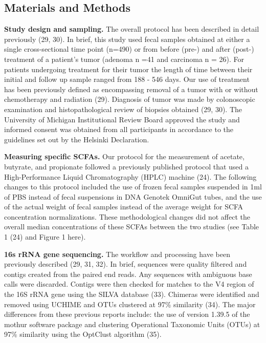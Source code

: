 \documentclass[11pt,]{article}
\begin{document}
\newpage

\subsection{Materials and Methods}\label{materials-and-methods}

\textbf{Study design and sampling.} The overall protocol has been
described in detail previously (29, 30). In brief, this study used fecal
samples obtained at either a single cross-sectional time point (n=490)
or from before (pre-) and after (post-) treatment of a patient's tumor
(adenoma n =41 and carcinoma n = 26). For patients undergoing treatment
for their tumor the length of time between their initial and follow up
sample ranged from 188 - 546 days. Our use of treatment has been
previously defined as encompassing removal of a tumor with or without
chemotherapy and radiation (29). Diagnosis of tumor was made by
colonoscopic examination and histopathological review of biopsies
obtained (29, 30). The University of Michigan Institutional Review Board
approved the study and informed consent was obtained from all
participants in accordance to the guidelines set out by the Helsinki
Declaration.

\textbf{Measuring specific SCFAs.} Our protocol for the measurement of
acetate, butyrate, and propionate followed a previously published
protocol that used a High-Performance Liquid Chromatography (HPLC)
machine (24). The following changes to this protocol included the use of
frozen fecal samples suspended in 1ml of PBS instead of fecal
suspensions in DNA Genotek OmniGut tubes, and the use of the actual
weight of fecal samples instead of the average weight for SCFA
concentration normalizations. These methodological changes did not
affect the overall median concentrations of these SCFAs between the two
studies (see Table 1 (24) and Figure 1 here).

\textbf{16s rRNA gene sequencing.} The workflow and processing have been
previously described (29, 31, 32). In brief, sequences were quality
filtered and contigs created from the paired end reads. Any sequences
with ambiguous base calls were discarded. Contigs were then checked for
matches to the V4 region of the 16S rRNA gene using the SILVA database
(33). Chimeras were identified and removed using UCHIME and OTUs
clustered at 97\% similarity (34). The major differences from these
previous reports include: the use of version 1.39.5 of the mothur
software package and clustering Operational Taxonomic Units (OTUs) at
97\% similarity using the OptClust algorithm (35).
\end{document}
